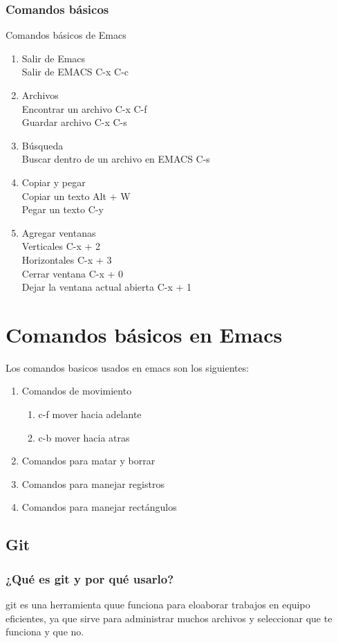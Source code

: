 \documentclass[11pt,letterpaper]{article}
\begin{document}
\subsection{Comandos básicos}
\large {Comandos básicos de Emacs}
\begin{enumerate}
\item Salir de Emacs\\
  Salir de EMACS C-x C-c
\item Archivos\\
  Encontrar un archivo C-x C-f\\
  Guardar archivo C-x C-s
\item Búsqueda\\
  Buscar dentro de un archivo en EMACS C-s
\item Copiar y pegar\\
  Copiar un texto Alt + W\\
  Pegar un texto C-y
\item Agregar ventanas\\
  Verticales C-x + 2\\
  Horizontales C-x + 3\\
  Cerrar ventana C-x + 0\\
  Dejar la ventana actual abierta C-x + 1\\
  
\end{enumerate}  
\setcounter{ćhapter}{5} 
\chapter {Comandos básicos en Emacs}
Los comandos basicos usados en emacs son los siguientes:
\begin {enumerate}
\item Comandos de movimiento
  \begin {enumerate}
    \item c-f mover hacia adelante
    \item c-b mover hacia atras
   \end {enumerate}
\item Comandos para matar y borrar
\item Comandos para manejar registros
\item Comandos para manejar rectángulos
\end{enumerate}
\section{Git}
\subsection{¿Qué es git y por qué usarlo?}
git es una herramienta quue funciona para eloaborar trabajos en equipo eficientes, ya que sirve para administrar muchos archivos y seleccionar que te funciona y que no.
\end{document}
